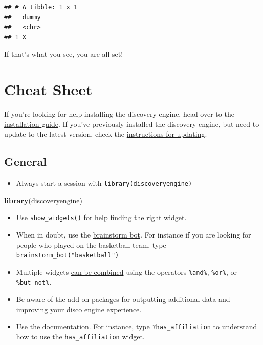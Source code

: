 \documentclass[]{book}
\newenvironment{Shaded}{\begin{snugshade}}{\end{snugshade}}
\newcommand{\KeywordTok}[1]{\textcolor[rgb]{0.13,0.29,0.53}{\textbf{#1}}}
\newcommand{\NormalTok}[1]{#1}
\providecommand{\tightlist}{%
  \setlength{\itemsep}{0pt}\setlength{\parskip}{0pt}}
\begin{document}
\begin{verbatim}
## # A tibble: 1 x 1
##   dummy
##   <chr>
## 1 X
\end{verbatim}

If that's what you see, you are all set!

\hypertarget{cheat-sheet}{%
\chapter{Cheat Sheet}\label{cheat-sheet}}

If you're looking for help installing the discovery engine, head over to the \href{https://cwolfsonseeley.github.io/discodocs/installation.html}{installation guide}. If you've previously installed the discovery engine, but need to update to the latest version, check the \href{https://cwolfsonseeley.github.io/discodocs/updating.html}{instructions for updating}.

\hypertarget{general}{%
\section{General}\label{general}}

\begin{itemize}
\tightlist
\item
  Always start a session with \texttt{library(discoveryengine)}
\end{itemize}

\begin{Shaded}
\begin{Highlighting}[]
\KeywordTok{library}\NormalTok{(discoveryengine)}
\end{Highlighting}
\end{Shaded}

\begin{itemize}
\tightlist
\item
  Use \texttt{show\_widgets()} for help \protect\hyperlink{working-with-finding-widgets}{finding the right widget}.
\item
  When in doubt, use the \protect\hyperlink{brainstorm-bot}{brainstorm bot}. For instance if you are looking for people who played on the basketball team, type \texttt{brainstorm\_bot("basketball")}
\item
  Multiple widgets \protect\hyperlink{combining-widgets}{can be combined} using the operators \texttt{\%and\%}, \texttt{\%or\%}, or \texttt{\%but\_not\%}.
\item
  Be aware of the \protect\hyperlink{add-on-packages}{add-on packages} for outputting additional data and improving your disco engine experience.
\item
  Use the documentation. For instance, type \texttt{?has\_affiliation} to understand how to use the \texttt{has\_affiliation} widget.
\end{itemize}
\end{document}
